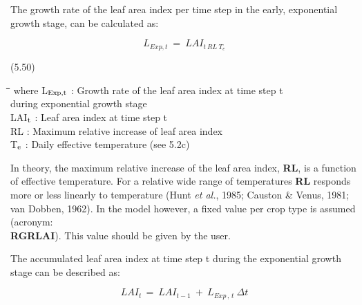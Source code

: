 \documentclass[11pt]{article}
\begin{document}
\bigskip
\bigskip
The growth rate of the leaf area index per time step in the early, exponential growth
stage, can be calculated as:

\begin{displaymath}
L _{Exp,t} ~=~LAI _{{t~RL~T}_{e}}
\end{displaymath}

 \bigskip
\strut\hfill (5.50)
\nwln
\begin{tabbing}
\hspace{1.27cm}\=\hspace{1.27cm}\=\hspace{1.27cm}\=\hspace{1.27cm}\=%
\hspace{1.27cm}\=\hspace{1.27cm}\=\hspace{1.27cm}\=\hspace{1.27cm}\=%
\hspace{1.27cm}\=\hspace{1.27cm}\=\kill
where\> L$_{{\rm Exp,t}}$\> : Growth rate of the leaf area index at time step t\\
\>\>   during exponential growth stage\> \> \> \> \> \> \> \> [ha ha$^{{\rm -1}}$ d$^{{\rm -1}}$]\\
\>LAI$_{{\rm t}}$\> : Leaf area index at time step t\> \> \> \> \> \>  \> \> [ha ha$^{{\rm -1}}$]\\
\>RL\> : Maximum relative increase of leaf area index \> \> \> \> \> \> \> \> [\degrees C$^{{\rm -1}}$ d$^{{\rm -1}}$]\\
\>T$_{{\rm e}}$\> : Daily effective temperature (see 5.2c)\> \> \> \> \> \> \> \> [\degrees C]
\end{tabbing}

\bigskip
\bigskip
In theory, the maximum relative increase of the leaf area index, {\bf RL}, is a function of
effective temperature. For a relative wide range of temperatures {\bf RL} responds more or
less linearly to tempera\-ture (Hunt {\it et al.\/}, 1985; Causton \& Venus, 1981; van Dobben,
1962). In the model however, a fixed value per crop type is assumed (acronym: \\
{\bf R\-GRLAI}). This value should be given by the user.

\bigskip
\bigskip
\bigskip
 The accumulated leaf area index at time step t during the exponential growth stage can be
described as:

\begin{displaymath}
LAI _{t~} =~LAI _{t-1} ~+~L _{Exp\, ,\, t} ~\Delta t
\end{displaymath}
\end{document}
